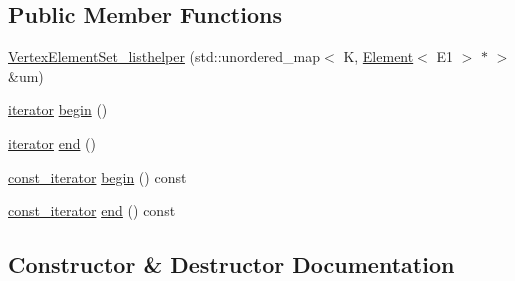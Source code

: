 \subsection*{Public Member Functions}
\begin{DoxyCompactItemize}
\item 
\hyperlink{classbridges_1_1datastructure_1_1_graph_adj_list_1_1_vertex_element_set__listhelper_a498a884dd8d896433c057cf45208f73b}{Vertex\+Element\+Set\+\_\+listhelper} (std\+::unordered\+\_\+map$<$ K, \hyperlink{classbridges_1_1datastructure_1_1_element}{Element}$<$ E1 $>$ $\ast$ $>$ \&um)
\item 
\hyperlink{classbridges_1_1datastructure_1_1_graph_adj_list_1_1_vertex_element_set__listhelper_1_1iterator}{iterator} \hyperlink{classbridges_1_1datastructure_1_1_graph_adj_list_1_1_vertex_element_set__listhelper_a7903e33821742f555cc3e4465a6c81aa}{begin} ()
\item 
\hyperlink{classbridges_1_1datastructure_1_1_graph_adj_list_1_1_vertex_element_set__listhelper_1_1iterator}{iterator} \hyperlink{classbridges_1_1datastructure_1_1_graph_adj_list_1_1_vertex_element_set__listhelper_a437c23955211e60351a6fcb8dcff65a6}{end} ()
\item 
\hyperlink{classbridges_1_1datastructure_1_1_graph_adj_list_1_1_vertex_element_set__listhelper_1_1const__iterator}{const\+\_\+iterator} \hyperlink{classbridges_1_1datastructure_1_1_graph_adj_list_1_1_vertex_element_set__listhelper_ac0a45cd4acc2aeefaedd10ee9e954927}{begin} () const
\item 
\hyperlink{classbridges_1_1datastructure_1_1_graph_adj_list_1_1_vertex_element_set__listhelper_1_1const__iterator}{const\+\_\+iterator} \hyperlink{classbridges_1_1datastructure_1_1_graph_adj_list_1_1_vertex_element_set__listhelper_ade98a69d94c58ec30a24f0ed802fe672}{end} () const
\end{DoxyCompactItemize}


\subsection{Constructor \& Destructor Documentation}
\mbox{\label{classbridges_1_1datastructure_1_1_graph_adj_list_1_1_vertex_element_set__listhelper_a498a884dd8d896433c057cf45208f73b}} 
